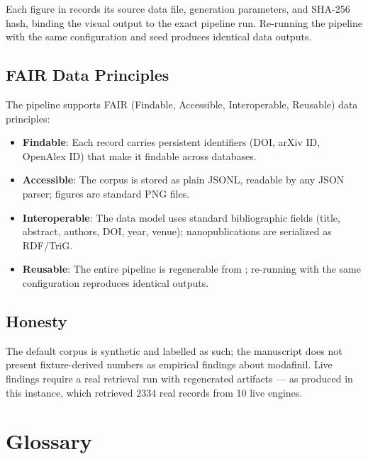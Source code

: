\documentclass[
  english,
]{article}
\providecommand{\tightlist}{%
  \setlength{\itemsep}{0pt}\setlength{\parskip}{0pt}}
\begin{document}
Each figure in  records its source data
file, generation parameters, and SHA-256 hash, binding the visual output
to the exact pipeline run. Re-running the pipeline with the same
configuration and seed produces identical data outputs.

\subsection{FAIR Data Principles}\label{fair-data-principles}

The pipeline supports FAIR (Findable, Accessible, Interoperable,
Reusable) data principles:

\begin{itemize}
\tightlist
\item
  \textbf{Findable}: Each record carries persistent identifiers (DOI,
  arXiv ID, OpenAlex ID) that make it findable across databases.
\item
  \textbf{Accessible}: The corpus is stored as plain JSONL, readable by
  any JSON parser; figures are standard PNG files.
\item
  \textbf{Interoperable}: The data model uses standard bibliographic
  fields (title, abstract, authors, DOI, year, venue); nanopublications
  are serialized as RDF/TriG.
\item
  \textbf{Reusable}: The entire pipeline is regenerable from
  ; re-running with the same
  configuration reproduces identical outputs.
\end{itemize}

\subsection{Honesty}\label{honesty}

The default corpus is synthetic and labelled as such; the manuscript
does not present fixture-derived numbers as empirical findings about
modafinil. Live findings require a real retrieval run with regenerated
artifacts --- as produced in this instance, which retrieved 2334 real
records from 10 live engines.

\newpage

\section{Glossary}\label{glossary}
\end{document}
